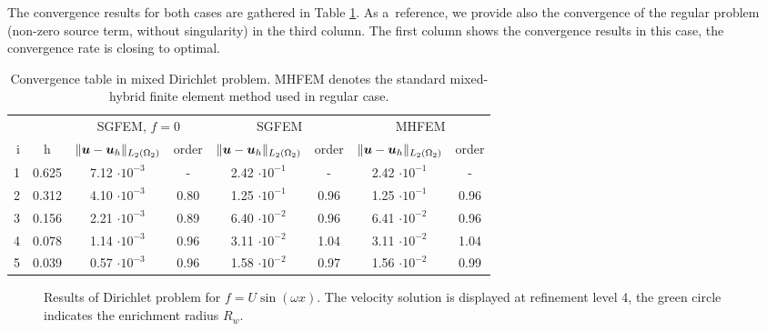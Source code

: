 The convergence results for both cases are gathered in Table \ref{tab:convergence_mh_dirichlet}.
As a~reference, we provide also the convergence of the regular problem (non-zero source term, without singularity)
in the third column.
The first column shows the convergence results in this case, the convergence rate is closing to optimal.
%
\begin{table}[!htb]
\vspace{0.5cm}
\begin{center}
\bgroup
\def\arraystretch{1.2}
\setlength\tabcolsep{5pt}
\begin{tabular}{rc|cc|cc|cc}
\toprule
\multicolumn{2}{c|}{} & \multicolumn{2}{c|}{ SGFEM, $f=0$} & \multicolumn{2}{c|}{SGFEM} & \multicolumn{2}{c}{MHFEM}\\ [3pt] %
i & h & $\|\mathbf{\boldsymbol{u}}-\mathbf{\boldsymbol{u}}_h\|_{L_2(\Omega_2)}$ & order & $\|\mathbf{\boldsymbol{u}}-\mathbf{\boldsymbol{u}}_h\|_{L_2(\Omega_2)}$
    & order & $\|\mathbf{\boldsymbol{u}}-\mathbf{\boldsymbol{u}}_h\|_{L_2(\Omega_2)}$ & order \\ [3pt] \midrule
1 & 0.625 &  7.12 $\cdot10^{-3}$  &  -   &  2.42 $\cdot10^{-1}$  &  -   & 2.42 $\cdot10^{-1}$  &   -   \\
2 & 0.312 &  4.10 $\cdot10^{-3}$  & 0.80 &  1.25 $\cdot10^{-1}$  & 0.96 & 1.25 $\cdot10^{-1}$ &  0.96 \\
3 & 0.156 &  2.21 $\cdot10^{-3}$  & 0.89 &  6.40 $\cdot10^{-2}$  & 0.96 & 6.41 $\cdot10^{-2}$ &  0.96 \\
4 & 0.078 &  1.14 $\cdot10^{-3}$  & 0.96 &  3.11 $\cdot10^{-2}$  & 1.04 & 3.11 $\cdot10^{-2}$ &  1.04 \\
5 & 0.039 &  0.57 $\cdot10^{-3}$  & 0.96 &  1.58 $\cdot10^{-2}$  & 0.97 & 1.56 $\cdot10^{-2}$ &  0.99 \\
\bottomrule
\end{tabular}
\caption[Convergence table in mixed Dirichlet problem.]{Convergence table in mixed Dirichlet problem.
    MHFEM denotes the standard mixed-hybrid finite element method used in regular case.}
\label{tab:convergence_mh_dirichlet}
\egroup
\end{center}
\end{table}
%
\begin{figure}[!htb]
    \centering
    \caption[Dirichlet problem results, nonzero source term.]
    {Results of Dirichlet problem for $f=U\sin(\omega x)$. The velocity solution is displayed at refinement level 4,
    the green circle indicates the enrichment radius $R_w$.}
    \label{fig:mh_dirichlet_source}
\end{figure}


